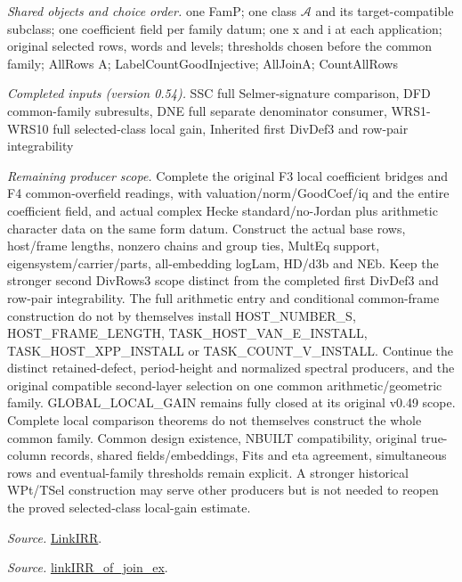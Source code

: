\emph{Shared objects and choice order.} one FamP; one class $\mathcal A$ and its target-compatible subclass; one coefficient field per family datum; one x and i at each application; original selected rows, words and levels; thresholds chosen before the common family; AllRows A; LabelCountGoodInjective; AllJoinA; CountAllRows

\emph{Completed inputs (version 0.54).} SSC full Selmer-signature comparison, DFD common-family subresults, DNE full separate denominator consumer, WRS1-WRS10 full selected-class local gain, Inherited first DivDef3 and row-pair integrability

\emph{Remaining producer scope.} Complete the original F3 local coefficient bridges and F4 common-overfield readings, with valuation/norm/GoodCoef/iq and the entire coefficient field, and actual complex Hecke standard/no-Jordan plus arithmetic character data on the same form datum. Construct the actual base rows, host/frame lengths, nonzero chains and group ties, MultEq support, eigensystem/carrier/parts, all-embedding logLam, HD/d3b and NEb. Keep the stronger second DivRows3 scope distinct from the completed first DivDef3 and row-pair integrability. The full arithmetic entry and conditional common-frame construction do not by themselves install HOST\_\allowbreak NUMBER\_\allowbreak S, HOST\_\allowbreak FRAME\_\allowbreak LENGTH, TASK\_\allowbreak HOST\_\allowbreak VAN\_\allowbreak E\_\allowbreak INSTALL, TASK\_\allowbreak HOST\_\allowbreak XPP\_\allowbreak INSTALL or TASK\_\allowbreak COUNT\_\allowbreak V\_\allowbreak INSTALL. Continue the distinct retained-defect, period-height and normalized spectral producers, and the original compatible second-layer selection on one common arithmetic/geometric family. GLOBAL\_\allowbreak LOCAL\_\allowbreak GAIN remains fully closed at its original v0.49 scope. Complete local comparison theorems do not themselves construct the whole common family. Common design existence, NBUILT compatibility, original true-column records, shared fields/embeddings, Fits and eta agreement, simultaneous rows and eventual-family thresholds remain explicit. A stronger historical WPt/TSel construction may serve other producers but is not needed to reopen the proved selected-class local-gain estimate.

\emph{Source.} \href{https://github.com/CocoSgt/riemann-hypothesis-lean/blob/7cbf7a0c32fca1badf05931879a37c3f8a2b03b4/src/Formalism/SharpRestriction/GlobalTheoremInputs.lean#L55-L58}{LinkIRR}.

\emph{Source.} \href{https://github.com/CocoSgt/riemann-hypothesis-lean/blob/7cbf7a0c32fca1badf05931879a37c3f8a2b03b4/src/Development/AbelianVarietyTheory/Proofs/GlobalInterpolation/LinkIRROfJoinEx.lean#L17-L38}{linkIRR\_\allowbreak of\_\allowbreak join\_\allowbreak ex}.


